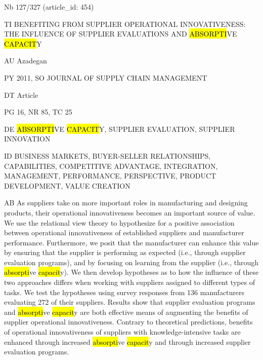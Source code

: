 \documentclass[a4paper]{article}
\begin{document}
\vspace*{-2cm}
Nb \tabto{0cm}127/327 (article\_id: 454)\par
TI \tabto{0cm}BENEFITING FROM SUPPLIER OPERATIONAL INNOVATIVENESS: THE INFLUENCE OF SUPPLIER EVALUATIONS AND \hl{ABSORPTI}VE \hl{CAPACIT}Y\par
AU \tabto{0cm}Azadegan\par
PY \tabto{0cm}2011, SO JOURNAL OF SUPPLY CHAIN MANAGEMENT\par
DT \tabto{0cm}Article\par
PG \tabto{0cm}16, NR 85, TC 25\par
DE \tabto{0cm}\hl{ABSORPTI}VE \hl{CAPACIT}Y, SUPPLIER EVALUATION, SUPPLIER INNOVATION\par
ID \tabto{0cm}BUSINESS MARKETS, BUYER-SELLER RELATIONSHIPS, CAPABILITIES, COMPETITIVE ADVANTAGE, INTEGRATION, MANAGEMENT, PERFORMANCE, PERSPECTIVE, PRODUCT DEVELOPMENT, VALUE CREATION\par
AB \tabto{0cm}As suppliers take on more important roles in manufacturing and designing products, their operational innovativeness becomes an important source of value. We use the relational view theory to hypothesize for a positive association between operational innovativeness of established suppliers and manufacturer performance. Furthermore, we posit that the manufacturer can enhance this value by ensuring that the supplier is performing as expected (i.e., through supplier evaluation programs), and by focusing on learning from the supplier (i.e., through \hl{absorpti}ve \hl{capacit}y). We then develop hypotheses as to how the influence of these two approaches differs when working with suppliers assigned to different types of tasks. We test the hypotheses using survey responses from 136 manufacturers evaluating 272 of their suppliers. Results show that supplier evaluation programs and \hl{absorpti}ve \hl{capacit}y are both effective means of augmenting the benefits of supplier operational innovativeness. Contrary to theoretical predictions, benefits of operational innovativeness of suppliers with knowledge-intensive tasks are enhanced through increased \hl{absorpti}ve \hl{capacit}y and through increased supplier evaluation programs.\par
\clearpage
\end{document}
